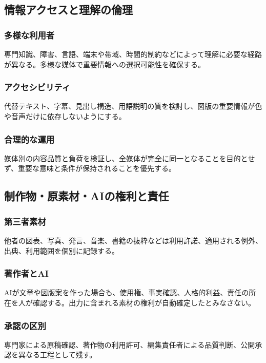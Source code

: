 \documentclass[a4paper,11pt]{article}
\begin{document}
\subsection{情報アクセスと理解の倫理}
\subsubsection{多様な利用者}
\par 専門知識、障害、言語、端末や帯域、時間的制約などによって理解に必要な経路が異なる。多様な媒体で重要情報への選択可能性を確保する。\par\medskip
\subsubsection{アクセシビリティ}
\par 代替テキスト、字幕、見出し構造、用語説明の質を検討し、図版の重要情報が色や音声だけに依存しないようにする。\par\medskip
\subsubsection{合理的な運用}
\par 媒体別の内容品質と負荷を検証し、全媒体が完全に同一となることを目的とせず、重要な意味と条件が保持されることを優先する。\par\medskip
\subsection{制作物・原素材・AIの権利と責任}
\subsubsection{第三者素材}
\par 他者の図表、写真、発言、音楽、書籍の抜粋などは利用許諾、適用される例外、出典、利用範囲を個別に記録する。\par\medskip
\subsubsection{著作者とAI}
\par AIが文章や図版案を作った場合も、使用権、事実確認、人格的利益、責任の所在を人が確認する。出力に含まれる素材の権利が自動確定したとみなさない。\par\medskip
\subsubsection{承認の区別}
\par 専門家による原稿確認、著作物の利用許可、編集責任者による品質判断、公開承認を異なる工程として残す。\par\medskip
\end{document}
